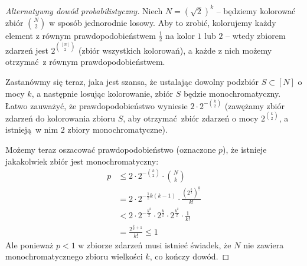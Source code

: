 \begin{proof}[Alternatywny dowód probabilistyczny]
	Niech \(N = (\sqrt{2})^{k}\) -- będziemy kolorować zbiór \(\binom{N}{2}\) w sposób jednorodnie losowy.
	Aby to zrobić, kolorujemy każdy element z równym prawdopodobieństwem \(\frac{1}{2}\) na kolor \(1\) lub \(2\) -- wtedy zbiorem zdarzeń
	jest \(2^{\binom{[N]}{2}}\) (zbiór wszystkich kolorowań), a każde z nich możemy otrzymać z równym prawdopodobieństwem.

	Zastanówmy się teraz, jaka jest szansa, że ustalając dowolny podzbiór \(S \subset [N]\) o mocy \(k\), a następnie losując kolorowanie,
	zbiór \(S\) będzie monochromatyczny. Łatwo zauważyć, że prawdopodobieństwo wyniesie \(2 \cdot 2^{-\binom{k}{2}}\) (zawężamy zbiór zdarzeń do kolorowania zbioru \(S\), aby
	otrzymać zbiór zdarzeń o mocy \(2^{\binom{k}{2}}\), a istnieją w nim \(2\) zbiory monochromatyczne).

	Możemy teraz oszacować prawdopodobieństwo (oznaczone \(p\)), że istnieje jakakolwiek zbiór jest monochromatyczny:
	\begin{align*}
		p & \leq 2 \cdot 2^{-\binom{k}{2}} \cdot \binom{N}{k}                                             \\
		  & = 2 \cdot 2^{-\frac{1}{2}k(k-1)} \cdot \frac{{(2^{\frac{k}{2}})}^{\underline{k}}}{k!}         \\
		  & < 2 \cdot 2^{-\frac{k^2}{2}} \cdot 2^{\frac{k}{2}} \cdot 2^{\frac{k^2}{2}} \cdot \frac{1}{k!} \\
		  & = \frac{2^{\frac{k}{2}+1}}{k!} \leq 1
	\end{align*}
	Ale ponieważ \(p < 1\) w zbiorze zdarzeń musi istnieć świadek, że
	\(N\) nie zawiera monochromatycznego zbioru wielkości \(k\), co kończy dowód.
\end{proof}
